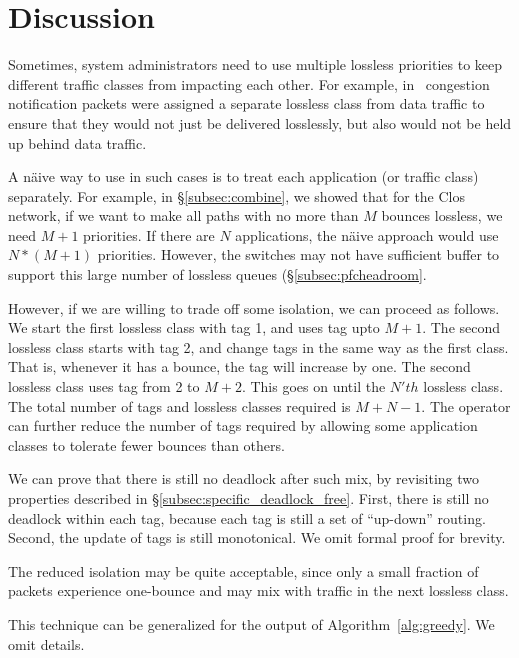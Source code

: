 \section{Discussion}

 Sometimes, system administrators need to
use multiple lossless priorities to keep different traffic classes from impacting each
other. For example, in~\cite{dcqcn} congestion notification packets were
assigned a separate lossless class from data traffic to ensure that they would
not just be delivered losslessly, but also would not be held up behind data
traffic.

A n{\"a}ive way to use \sysname{} in such cases is to treat each application (or
traffic class) separately.  For example, in \S\ref{subsec:combine}, we showed
that for the Clos network, if we want to make  all paths with no more than $M$
bounces lossless, we need $M+1$ priorities. If there are $N$ applications, the
n{\"a}ive approach would use $N*(M+1)$ priorities.  However, the switches may
not have sufficient buffer to support this large number of lossless queues
(\S\ref{subsec:pfcheadroom}.

However, if we are willing to trade off some isolation, we can proceed as
follows.  We start the first lossless class with tag 1, and uses tag upto $M+1$.
The second lossless class starts with tag 2, and change tags in the same way as
the first class.  That is, whenever it has a bounce, the tag will increase by
one. The second lossless class uses tag from 2 to $M+2$. This goes on until the
$N'th$ lossless class. The total number of tags and lossless classes required is
$M + N -1$. The operator can further reduce the number of tags required by allowing
some application classes to tolerate fewer bounces than others.

We can prove that there is still no deadlock after such mix, by revisiting two
properties described in \S\ref{subsec:specific_deadlock_free}. First, there is
still no deadlock within each tag, because each tag is still a set of
``up-down'' routing. Second, the update of tags is still monotonical. We omit
formal proof for brevity.

The reduced isolation may be quite acceptable, since only a small
fraction of packets experience one-bounce and may mix with traffic in the next
lossless class.

This technique can be generalized for the output of Algorithm~\ref{alg:greedy}.
We omit details.

 

